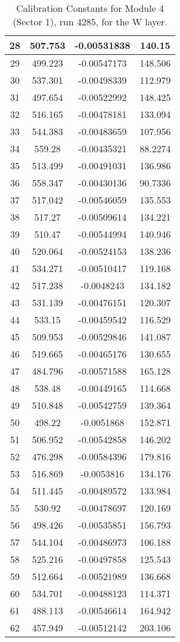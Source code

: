 \begin{table}[h]
{\begin{tabular}{|c|c|c|c|}
28	&	507.753	&	-0.00531838	&	140.15	\\	\hline
29	&	499.223	&	-0.00547173	&	148.506	\\	\hline
30	&	537.301	&	-0.00498339	&	112.979	\\	\hline
31	&	497.654	&	-0.00522992	&	148.425	\\	\hline
32	&	516.165	&	-0.00478181	&	133.094	\\	\hline
33	&	544.383	&	-0.00483659	&	107.956	\\	\hline
34	&	559.28	&	-0.00435321	&	88.2274	\\	\hline
35	&	513.499	&	-0.00491031	&	136.986	\\	\hline
36	&	558.347	&	-0.00430136	&	90.7336	\\	\hline
37	&	517.042	&	-0.00546059	&	135.553	\\	\hline
38	&	517.27	&	-0.00509614	&	134.221	\\	\hline
39	&	510.47	&	-0.00544994	&	140.946	\\	\hline
40	&	520.064	&	-0.00524153	&	138.236	\\	\hline
41	&	534.271	&	-0.00510417	&	119.168	\\	\hline
42	&	517.238	&	-0.0048243	&	134.182	\\	\hline
43	&	531.139	&	-0.00476151	&	120.307	\\	\hline
44	&	533.15	&	-0.00459542	&	116.529	\\	\hline
45	&	509.953	&	-0.00529846	&	141.087	\\	\hline
46	&	519.665	&	-0.00465176	&	130.655	\\	\hline
47	&	484.796	&	-0.00571588	&	165.128	\\	\hline
48	&	538.48	&	-0.00449165	&	114.668	\\	\hline
49	&	510.848	&	-0.00542759	&	139.364	\\	\hline
50	&	498.22	&	-0.0051868	&	152.871	\\	\hline
51	&	506.952	&	-0.00542858	&	146.202	\\	\hline
52	&	476.298	&	-0.00584396	&	179.816	\\	\hline
53	&	516.869	&	-0.0053816	&	134.176	\\	\hline
54	&	511.445	&	-0.00489572	&	133.984	\\	\hline
55	&	530.92	&	-0.00478697	&	120.169	\\	\hline
56	&	498.426	&	-0.00535851	&	156.793	\\	\hline
57	&	544.104	&	-0.00486973	&	106.188	\\	\hline
58	&	525.216	&	-0.00497858	&	125.543	\\	\hline
59	&	512.664	&	-0.00521989	&	136.668	\\	\hline
60	&	534.701	&	-0.00488123	&	114.371	\\	\hline
61	&	488.113	&	-0.00546614	&	164.942	\\	\hline
62	&	457.949	&	-0.00512142	&	203.106	\\	\hline
              \end{tabular}
        }
        \caption{Calibration Constants for Module 4 (Sector 1), run 4285, for the W layer.}
\end{table}

